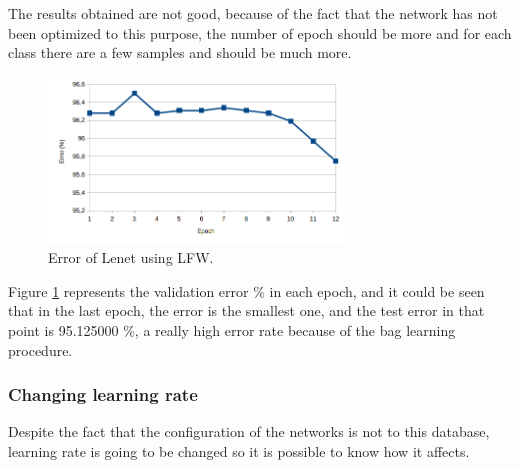 The results obtained are not good, because of the fact that the network has not been optimized to this purpose, the number of epoch should be more and for each class there are a few samples and should be much more.\\

\begin{figure}[htb]
\centering
\includegraphics[width=0.7\textwidth]{images/epoch_LFW.png}
\caption{Error of Lenet using LFW.} \label{fig:LENETLFW}
\end{figure}

Figure \ref{fig:LENETLFW} represents the validation error \% in each epoch, and it could be seen that in the last epoch, the error is the smallest one, and the test error in that point is 95.125000 \%, a really high error rate because of the bag learning procedure.\\

\subsubsection{Changing learning rate}
Despite the fact that the configuration of the networks is not to this database, learning rate is going to be changed so it is possible to know how it affects.\\

